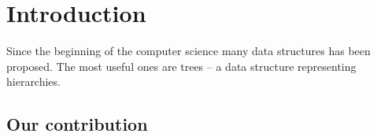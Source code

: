 \chapter*{Introduction}

Since the beginning of the computer science many data structures has been proposed.
The most useful ones are trees -- a data structure representing hierarchies.

\section{Our contribution}

